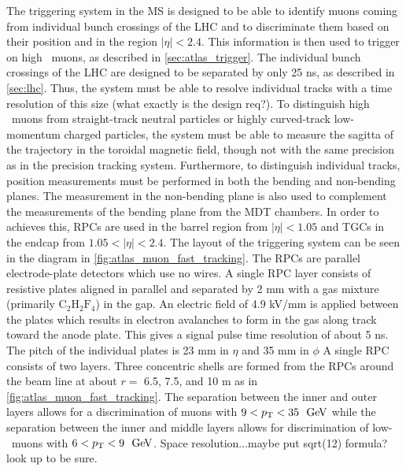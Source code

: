 The triggering system in the MS is designed to be able
to identify muons coming from individual bunch crossings of the LHC
and to discriminate them based on their position and \pt in the region
$|\eta|<2.4$. This information
is then used to trigger on high \pt~muons, as 
described in \sec\ref{sec:atlas_trigger}.
The individual bunch crossings of the LHC are designed to 
be separated by only 25 ns, as described in \sec\ref{sec:lhc}.
Thus, the system must be able to resolve individual tracks 
with a time resolution of this size (what exactly is the design req?).
To distinguish high \pt~muons from straight-track neutral particles 
or highly curved-track low-momentum charged particles, the 
system must be able to measure the sagitta of the 
trajectory in the toroidal magnetic field, though not 
with the same precision as in the precision tracking system.
Furthermore, to distinguish individual tracks, position measurements
must be performed in both the bending and non-bending planes.
The measurement in the non-bending plane is also used to complement
the measurements of the bending plane from the MDT chambers.
In order to achieves this, RPCs are used in the barrel region
from $|\eta|<1.05$ and TGCs in the endcap from $1.05 < |\eta|<2.4$.
The layout of the triggering system can be seen in the diagram
in \fig\ref{fig:atlas_muon_fast_tracking}. %
The RPCs are parallel electrode-plate detectors which use no wires.
A single RPC layer consists of 
resistive plates aligned in parallel and separated by 2 mm 
with a gas mixture (primarily $\textrm{C}_2\textrm{H}_2\textrm{F}_4$)
in the gap. An electric field of 4.9 kV/mm is applied between 
the plates which results in electron avalanches to form in the gas
along track toward the anode plate.
This gives a signal pulse time resolution of about 5 ns.
The pitch of the individual plates is 23 mm in $\eta$ and 35 mm in $\phi$
A single RPC consists of two layers.  Three concentric shells 
are formed from the RPCs around the beam line at about $r = $ 6.5, 7.5, and 10 m
as in \fig\ref{fig:atlas_muon_fast_tracking}.
The separation between the inner and outer layers 
allows for a discrimination of muons with $9 < \pt < 35~\GeV$
while the separation between the inner and middle layers allows for 
discrimination of low-\pt~muons with $6 < \pt < 9~\GeV$.
Space resolution...maybe put sqrt(12) formula? look up to be sure.


